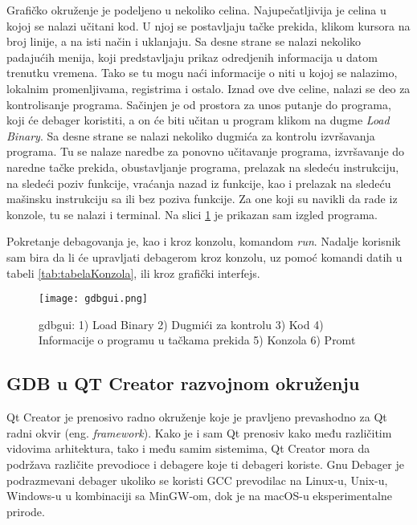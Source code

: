 \documentclass[a4paper]{article}
\begin{document}
Grafičko okruženje je podeljeno u nekoliko celina. Najupečatljivija je celina u kojoj se nalazi učitani kod. 
U njoj se postavljaju tačke prekida, klikom kursora na broj linije, a na isti način i uklanjaju.
Sa desne strane se nalazi nekoliko padajućih menija, koji predstavljaju prikaz odredjenih informacija 
u datom trenutku vremena. Tako se tu mogu naći informacije o niti u kojoj se nalazimo, lokalnim promenljivama, 
registrima i ostalo. Iznad ove dve celine, nalazi se deo za kontrolisanje programa. Sačinjen je od prostora
za unos putanje do programa, koji će debager koristiti, a on će biti učitan u program klikom na dugme 
\textit{Load Binary}. Sa desne strane se nalazi nekoliko dugmića za kontrolu izvršavanja programa.
Tu se nalaze naredbe za ponovno učitavanje programa, izvršavanje do naredne tačke prekida, obustavljanje
programa, prelazak na sledeću instrukciju, na sledeći poziv funkcije, vraćanja nazad iz funkcije, kao i prelazak
na sledeću mašinsku instrukciju sa ili bez poziva funkcije. Za one koji su navikli da rade iz konzole, tu se nalazi 
i terminal. Na slici \ref{fig:gdbgui} je prikazan sam izgled programa.

Pokretanje debagovanja je, kao i kroz konzolu, komandom \textit{run}. Nadalje korisnik sam bira da li će 
upravljati debagerom kroz konzolu, uz pomoć komandi datih u tabeli \ref{tab:tabelaKonzola}, ili kroz grafički interfejs.

\begin{figure}[h!]
\begin{center}
\texttt{[image: gdbgui.png]}
\end{center}
\caption{gdbgui: 1) Load Binary 2) Dugmići za kontrolu 3) Kod 4) Informacije o programu u tačkama prekida 5) Konzola 6) Promt}
\label{fig:gdbgui}
\end{figure}

\subsection{GDB u QT Creator razvojnom okruženju}
\label{subsec:QT}

Qt Creator je prenosivo radno okruženje koje je pravljeno prevashodno za Qt radni okvir (eng. \textit{framework}).
Kako je i sam Qt prenosiv kako među različitim vidovima arhitektura, tako i među samim sistemima, Qt Creator
mora da podržava različite prevodioce i debagere koje ti debageri koriste. Gnu Debager je podrazmevani debager
ukoliko se koristi GCC prevodilac na Linux-u, Unix-u, Windows-u u kombinaciji sa MinGW-om, dok je na macOS-u
eksperimentalne prirode. \cite{QT}
\end{document}
